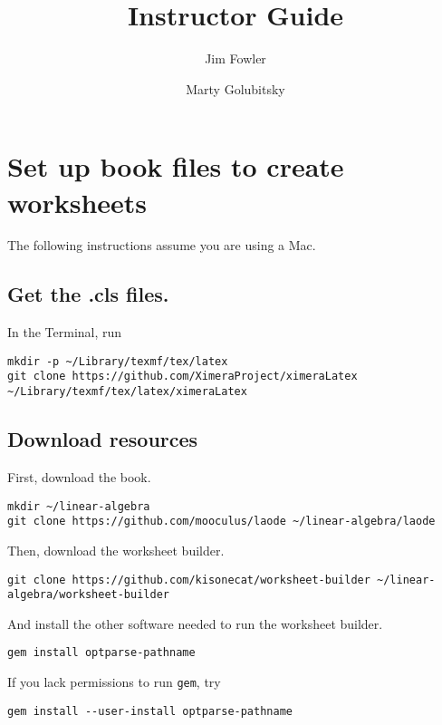 \documentclass{article}
\title{Instructor Guide}
\author{Jim Fowler \and Marty Golubitsky}
\begin{document}
\maketitle


\section{Set up book files to create worksheets}\label{instructor-guide}

The following instructions assume you are using a Mac.

\subsection{Get the .cls files.}\label{get-the-.cls-files.}

In the Terminal, run

\begin{verbatim}
mkdir -p ~/Library/texmf/tex/latex
git clone https://github.com/XimeraProject/ximeraLatex ~/Library/texmf/tex/latex/ximeraLatex
\end{verbatim}

\subsection{Download resources}\label{download-resources}

First, download the book.

\begin{verbatim}
mkdir ~/linear-algebra
git clone https://github.com/mooculus/laode ~/linear-algebra/laode
\end{verbatim}

Then, download the worksheet builder.

\begin{verbatim}
git clone https://github.com/kisonecat/worksheet-builder ~/linear-algebra/worksheet-builder
\end{verbatim}

And install the other software needed to run the worksheet builder.

\begin{verbatim}
gem install optparse-pathname
\end{verbatim}

If you lack permissions to run \texttt{gem}, try

\begin{verbatim}
gem install --user-install optparse-pathname
\end{verbatim}
\end{document}
